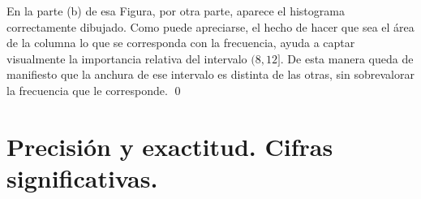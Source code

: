 En la parte (b) de esa Figura, por otra parte, aparece el histograma correctamente dibujado. Como puede apreciarse, el hecho de hacer que sea el área de la columna lo que se corresponda con la frecuencia, ayuda a captar visualmente la importancia relativa del intervalo $(8,12]$. De esta manera queda de manifiesto que la anchura de ese intervalo es distinta de las otras, sin sobrevalorar la frecuencia que le corresponde.
\qed



\section{Precisión y exactitud. Cifras significativas.}
\label{cap01:sec:PrecisionExactitudCifrasSignificativas}

